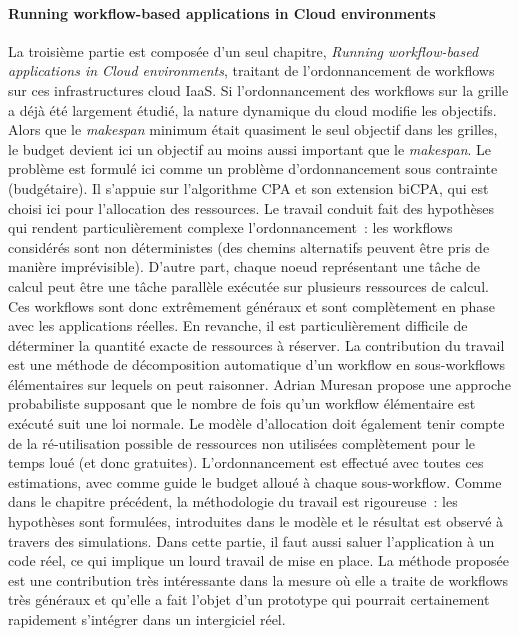 \documentclass[a4paper,12pt]{article}
\begin{document}
\paragraph{Running workflow-based applications in Cloud environments}
La   troisième  partie   est  composée   d'un  seul   chapitre,  \textit{Running
  workflow-based    applications   in    Cloud   environments},    traitant   de
l'ordonnancement  de   workflows  sur   ces  infrastructures  cloud   IaaS.   Si
l'ordonnancement des  workflows sur la  grille a  déjà été largement  étudié, la
nature dynamique du cloud modifie  les objectifs. Alors que le \textit{makespan}
minimum était quasiment le seul objectif dans les grilles, le budget devient ici
un objectif au moins aussi important  que le \textit{makespan}.  Le problème est
formulé ici comme un problème  d'ordonnancement sous contrainte (budgétaire). Il
s'appuie sur  l'algorithme CPA et son  extension biCPA, qui est  choisi ici pour
l'allocation des ressources.  Le travail conduit fait des hypothèses qui rendent
particulièrement complexe  l'ordonnancement~: les workflows considérés  sont non
déterministes   (des  chemins   alternatifs   peuvent  être   pris  de   manière
imprévisible).  D'autre part, chaque noeud représentant une tâche de calcul peut
être  une tâche  parallèle exécutée  sur  plusieurs ressources  de calcul.   Ces
workflows sont donc extrêmement généraux et  sont complètement en phase avec les
applications  réelles.   En  revanche,  il  est  particulièrement  difficile  de
déterminer  la quantité  exacte de  ressources à  réserver.  La  contribution du
travail  est  une   méthode  de  décomposition  automatique   d'un  workflow  en
sous-workflows  élémentaires  sur lequels  on  peut  raisonner.  Adrian  Muresan
propose une approche probabiliste supposant que le nombre de fois qu'un workflow
élémentaire  est exécuté  suit une  loi  normale.  Le  modèle d'allocation  doit
également tenir compte de la ré-utilisation possible de ressources non utilisées
complètement  pour le  temps  loué (et  donc  gratuites).  L'ordonnancement  est
effectué avec toutes ces estimations, avec comme guide le budget alloué à chaque
sous-workflow.  Comme dans le chapitre précédent, la méthodologie du travail est
rigoureuse~: les  hypothèses sont  formulées, introduites dans  le modèle  et le
résultat est  observé à  travers des  simulations.  Dans  cette partie,  il faut
aussi saluer l'application à  un code réel, ce qui implique  un lourd travail de
mise en place.  La méthode proposée  est une contribution très intéressante dans
la mesure où elle a traite de  workflows très généraux et qu'elle a fait l'objet
d'un  prototype   qui  pourrait  certainement  rapidement   s'intégrer  dans  un
intergiciel réel.
\end{document}
